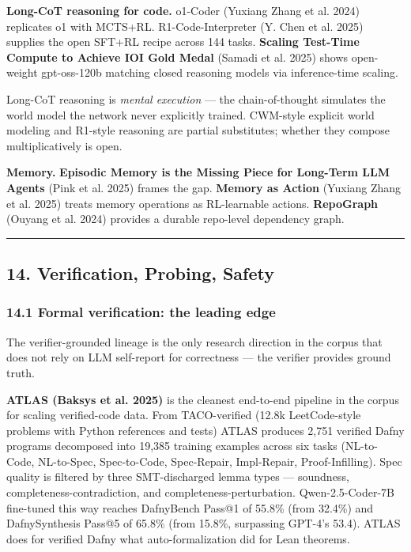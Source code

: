 \documentclass{article}
\begin{document}
\textbf{Long-CoT reasoning for code.} o1-Coder (Yuxiang Zhang et al.
2024) replicates o1 with MCTS+RL. R1-Code-Interpreter (Y. Chen et al.
2025) supplies the open SFT+RL recipe across 144 tasks. \textbf{Scaling
Test-Time Compute to Achieve IOI Gold Medal} (Samadi et al. 2025) shows
open-weight gpt-oss-120b matching closed reasoning models via
inference-time scaling.

Long-CoT reasoning is \emph{mental execution} --- the chain-of-thought
simulates the world model the network never explicitly trained.
CWM-style explicit world modeling and R1-style reasoning are partial
substitutes; whether they compose multiplicatively is open.

\textbf{Memory.} \textbf{Episodic Memory is the Missing Piece for
Long-Term LLM Agents} (Pink et al. 2025) frames the gap. \textbf{Memory
as Action} (Yuxiang Zhang et al. 2025) treats memory operations as
RL-learnable actions. \textbf{RepoGraph} (Ouyang et al. 2024) provides a
durable repo-level dependency graph.

\begin{center}\rule{0.5\linewidth}{0.5pt}\end{center}

\hypertarget{verification-probing-safety}{%
\subsection{14. Verification, Probing,
Safety}\label{verification-probing-safety}}

\hypertarget{formal-verification-the-leading-edge}{%
\subsubsection{14.1 Formal verification: the leading
edge}\label{formal-verification-the-leading-edge}}

The verifier-grounded lineage is the only research direction in the
corpus that does not rely on LLM self-report for correctness --- the
verifier provides ground truth.

\textbf{ATLAS (Baksys et al. 2025)} is the cleanest end-to-end pipeline
in the corpus for scaling verified-code data. From TACO-verified (12.8k
LeetCode-style problems with Python references and tests) ATLAS produces
2,751 verified Dafny programs decomposed into 19,385 training examples
across six tasks (NL-to-Code, NL-to-Spec, Spec-to-Code, Spec-Repair,
Impl-Repair, Proof-Infilling). Spec quality is filtered by three
SMT-discharged lemma types --- soundness, completeness-contradiction,
and completeness-perturbation. Qwen-2.5-Coder-7B fine-tuned this way
reaches DafnyBench Pass@1 of 55.8\% (from 32.4\%) and DafnySynthesis
Pass@5 of 65.8\% (from 15.8\%, surpassing GPT-4's 53.4). ATLAS does for
verified Dafny what auto-formalization did for Lean theorems.
\end{document}
